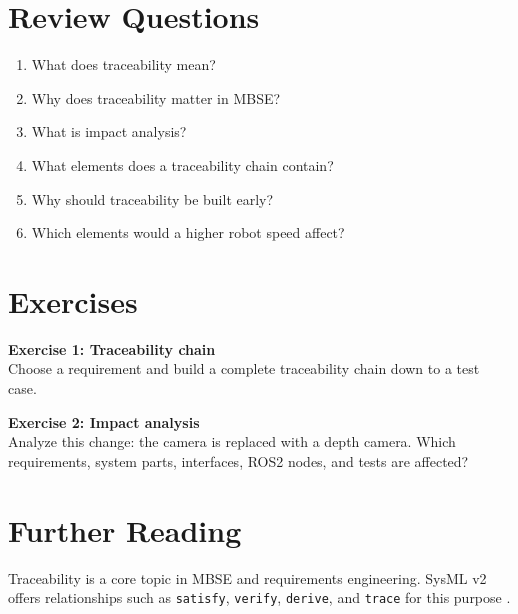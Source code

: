 \section{Review Questions}
\begin{enumerate}
    \item What does traceability mean?
    \item Why does traceability matter in MBSE?
    \item What is impact analysis?
    \item What elements does a traceability chain contain?
    \item Why should traceability be built early?
    \item Which elements would a higher robot speed affect?
\end{enumerate}

\section{Exercises}
\begin{uebungbox}
\textbf{Exercise 1: Traceability chain}\\
Choose a requirement and build a complete traceability chain down to a test case.
\end{uebungbox}

\begin{uebungbox}
\textbf{Exercise 2: Impact analysis}\\
Analyze this change: the camera is replaced with a depth camera. Which requirements, system parts, interfaces, ROS2 nodes, and tests are affected?
\end{uebungbox}

\section{Further Reading}
Traceability is a core topic in MBSE and requirements engineering. SysML v2 offers relationships such as \texttt{satisfy}, \texttt{verify}, \texttt{derive}, and \texttt{trace} for this purpose \cite{sysmlv2pilot}.
